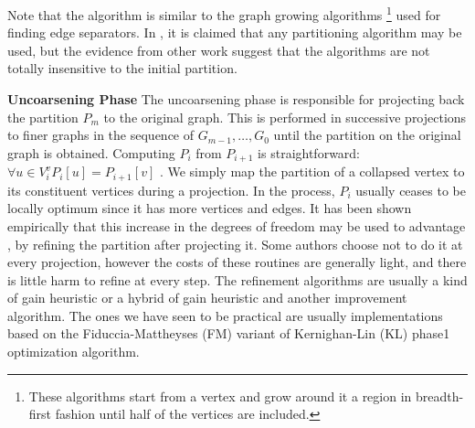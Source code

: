 \documentclass[a4paper,12pt]{article}
\begin{document}
\begin{description}
\begin{algorithm}
\caption{$\textsc{Levelized-Bisection}(G)$} \begin{algorithmic}[1]
\label{alg:bisect}
\end{algorithmic}\end{algorithm}

Note that the algorithm is similar to the graph growing algorithms
\footnote{ These algorithms start from a vertex and grow around it a
region in breadth-first fashion  until half of the vertices are
included.} used for finding edge separators. In \cite{bend}, it is
claimed that any partitioning algorithm may be used, but the evidence
from other work suggest that the algorithms are not totally
insensitive to the initial partition.

\item \textbf{Uncoarsening Phase} The uncoarsening phase is
responsible for projecting back the partition $P_m$ to the original
graph. This is performed in successive projections to finer graphs in
the sequence of
$G_{m-1},\dots,G_0$ until the partition on the original graph is
obtained.
Computing $P_{i}$ from $P_{i+1}$ is straightforward: $\forall u \in V_i^v
P_i[u] = P_{i+1}[v]$ \cite{gupta1}. We simply map the partition of a
collapsed vertex to its constituent vertices during a projection. In
the process, $P_i$ usually ceases to be locally optimum since it has more
vertices and edges. It has been shown empirically that this increase
in the degrees of freedom may be used to advantage \cite{kumar}
\cite{gupta1}, by refining the partition after projecting it. Some
authors choose not to do it at every projection\cite{bend}, however the costs of
these routines are generally light, and there is little harm to refine
at every step.
The refinement algorithms are usually a kind of gain heuristic or a
hybrid of gain heuristic and another improvement algorithm. The ones
we have seen to be practical are usually implementations based on
the Fiduccia-Mattheyses (FM) variant \cite{fm} of Kernighan-Lin (KL) phase1
optimization algorithm.\cite{kl}
\end{description}
\end{document}
